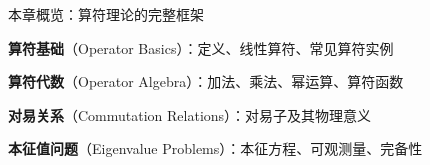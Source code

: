 
\begin{frame}{本章概览：算符理论的完整框架}
  \begin{iqbitemize}
    \item \textbf{算符基础}（Operator Basics）：定义、线性算符、常见算符实例
    \item \textbf{算符代数}（Operator Algebra）：加法、乘法、幂运算、算符函数
    \item \textbf{对易关系}（Commutation Relations）：对易子及其物理意义
    \item \textbf{本征值问题}（Eigenvalue Problems）：本征方程、可观测量、完备性
  \end{iqbitemize}

  \iqbbigsep

\end{frame}
